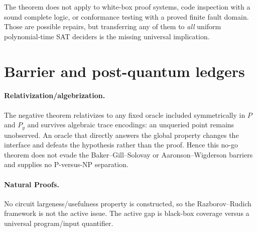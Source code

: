 \documentclass[11pt]{article}
\begin{document}
The theorem does not apply to white-box proof systems, code inspection with a sound complete logic, or conformance testing with a proved finite fault domain.  Those are possible repairs, but transferring any of them to \emph{all} uniform polynomial-time SAT deciders is the missing universal implication.

\section{Barrier and post-quantum ledgers}

\paragraph{Relativization/algebrization.}
The negative theorem relativizes to any fixed oracle included symmetrically in $P$ and $P_y$ and survives algebraic trace encodings: an unqueried point remains unobserved.  An oracle that directly answers the global property changes the interface and defeats the hypothesis rather than the proof.  Hence this no-go theorem does not evade the Baker--Gill--Solovay or Aaronson--Wigderson barriers and supplies no P-versus-NP separation.

\paragraph{Natural Proofs.}
No circuit largeness/usefulness property is constructed, so the Razborov--Rudich framework is not the active issue.  The active gap is black-box coverage versus a universal program/input quantifier.
\end{document}
